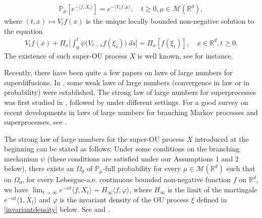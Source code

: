 \documentclass[12pt,a4paper]{amsart}
\theoremstyle{plain}
\theoremstyle{definition}
\numberwithin{equation}{section}
\begin{document}
\begin{align}
  \label{eq: def of V_t}
  \mathbb{P}_{\mu}[e^{-\langle f,X_t \rangle}]
  = e^{-\langle V_tf, \mu \rangle}
  , \quad t\geq 0, \mu \in \mathcal M(\mathbb R^d),
\end{align}
where $(t,x) \mapsto V_tf(x)$ is the unique locally bounded non-negative solution to the equation
\begin{align}
  V_tf(x) + \Pi_x \Big[ \int_0^t\psi\big(V_{t-s}f(\xi_s)\big)~ds\Big]
	= \Pi_x [f(\xi_t)]
  , \quad x\in \mathbb R^d, t\geq 0.
\end{align}	
The existence of such super-OU process $X$ is well known, see \cite{Dynkin1993Superprocesses} for instance.

Recently, there have been quite a few papers on laws of large numbers for superdiffusions. 
In \cite{Englander2009Law, EnglanderWinter2006Law, EnglanderTuraev2002A-scaling}, some weak laws of large numbers (convergence in law or in probability) were established. 
The strong law of large numbers for superprocesses was first studied in \cite{ChenRenWang2008An-almost}, followed by \cite{ChenRenSongZhang2015Strong-law, ChenRenYang2019Skeleton, EckhoffKyprianouWinkel2015Spines, KouritzinRen2014A-strong, LiuRenSong2013Strong, Wang2010An-almost} under different settings.
For a good survey on recent developments in laws of large numbers for branching Markov processes and superprocesses, see \cite{EckhoffKyprianouWinkel2015Spines}.

The strong law of large numbers for the super-OU process $X$ introduced at the beginning can be stated as follows:
Under some conditions on the branching mechanism $\psi$ (these conditions are satisfied under our Assumptions 1 and 2 below), there exists an $\Omega_0$ of $\mathbb{P}_\mu$-full probability for every $\mu\in\mathcal M(\mathbb R^d)$ such that on $\Omega_0$, for every Lebesgue-a.\/e. continuous bounded non-negative function $f$ on $\mathbb R^d$, we have $\lim_{t\to\infty} e^{-\alpha t} \langle f, X_t\rangle =H_\infty\langle f, \varphi\rangle $, where $H_\infty$ is the limit of the martingale $e^{-\alpha t}\langle 1,X_t\rangle$ and $\varphi$ is the invariant density of the OU process $\xi$ defined in \eqref{invariantdensity} below.
See \cite[Theorem 2.13 \& Example 8.1]{ChenRenYang2019Skeleton} and \cite[Theorem 1.2 \& Example 4.1]{EckhoffKyprianouWinkel2015Spines}.
\end{document}
